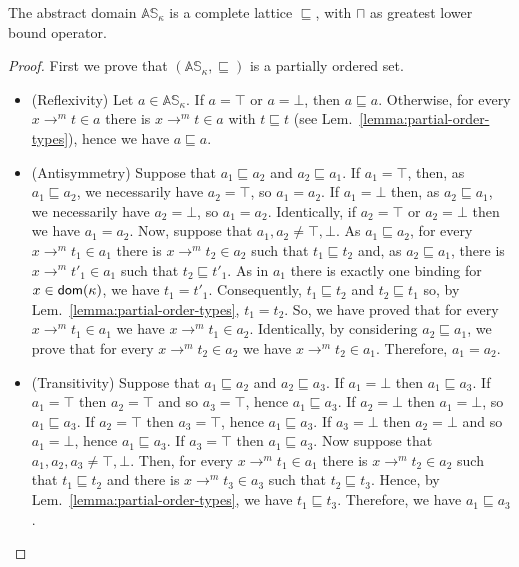 \begin{proposition}\label{prop:complete_lattice}
  The abstract domain $\mathbb{AS}_\kappa$ is a complete lattice \wrt $\sqsubseteq$,
  with $\sqcap$ as greatest lower bound operator.
\end{proposition}
\begin{proof}
  First we prove that $(\mathbb{AS}_\kappa,\sqsubseteq)$ is a partially ordered set.
  \begin{itemize}
    \item (Reflexivity) Let $a\in\mathbb{AS}_\kappa$. If $a=\top$ or $a=\bot$, then
    $a\sqsubseteq a$.
    Otherwise, for every $x\to^mt\in a$ there is $x\to^mt\in a$ with
    $t\sqsubseteq t$ (see Lem.~\ref{lemma:partial-order-types}), hence we have
    $a\sqsubseteq a$.
    \item (Antisymmetry) Suppose that $a_1 \sqsubseteq a_2$ and
    $a_2 \sqsubseteq a_1$. If $a_1=\top$, then, as $a_1 \sqsubseteq a_2$,
    we necessarily have $a_2=\top$, so $a_1=a_2$.
    If $a_1=\bot$ then, as $a_2\sqsubseteq a_1$, we necessarily have $a_2=\bot$,
    so $a_1=a_2$.
    Identically, if $a_2=\top$ or $a_2=\bot$ then we have $a_1=a_2$.
    Now, suppose that $a_1,a_2\not=\top,\bot$. As $a_1 \sqsubseteq a_2$, for every
    $x\to^mt_1\in a_1$ there is $x\to^mt_2\in a_2$ such that
    $t_1\sqsubseteq t_2$ and, as $a_2 \sqsubseteq a_1$, there is
    $x\to^mt'_1\in a_1$ such that $t_2\sqsubseteq t'_1$.
    As in $a_1$ there is exactly one binding for $x\in\mathsf{dom}(\kappa)$, we have
    $t_1=t'_1$. Consequently, $t_1\sqsubseteq t_2$ and $t_2\sqsubseteq t_1$
    so, by Lem.~\ref{lemma:partial-order-types}, $t_1=t_2$. So, we have
    proved that for every $x\to^mt_1\in a_1$ we have $x\to^mt_1\in a_2$.
    Identically, by considering $a_2 \sqsubseteq a_1$, we prove that
    for every $x\to^mt_2\in a_2$ we have $x\to^mt_2\in a_1$.
    Therefore, $a_1=a_2$.
    \item (Transitivity) Suppose that $a_1 \sqsubseteq a_2$ and
    $a_2 \sqsubseteq a_3$.
    If $a_1=\bot$ then $a_1\sqsubseteq a_3$.
    If $a_1=\top$ then $a_2=\top$ and so $a_3=\top$, hence $a_1\sqsubseteq a_3$.
    If $a_2=\bot$ then $a_1=\bot$, so $a_1\sqsubseteq a_3$.
    If $a_2=\top$ then $a_3=\top$, hence $a_1\sqsubseteq a_3$.
    If $a_3=\bot$ then $a_2=\bot$ and so $a_1=\bot$, hence $a_1\sqsubseteq a_3$.
    If $a_3=\top$ then $a_1\sqsubseteq a_3$.
    Now suppose that $a_1,a_2,a_3\not=\top,\bot$.
    Then, for every $x\to^mt_1\in a_1$ there is $x\to^mt_2\in a_2$ such that
    $t_1\sqsubseteq t_2$ and there is $x\to^mt_3\in a_3$ such that
    $t_2\sqsubseteq t_3$. Hence, by Lem.~\ref{lemma:partial-order-types},
    we have $t_1\sqsubseteq t_3$. Therefore, we have $a_1\sqsubseteq a_3$.
  \end{itemize}


\end{proof}
